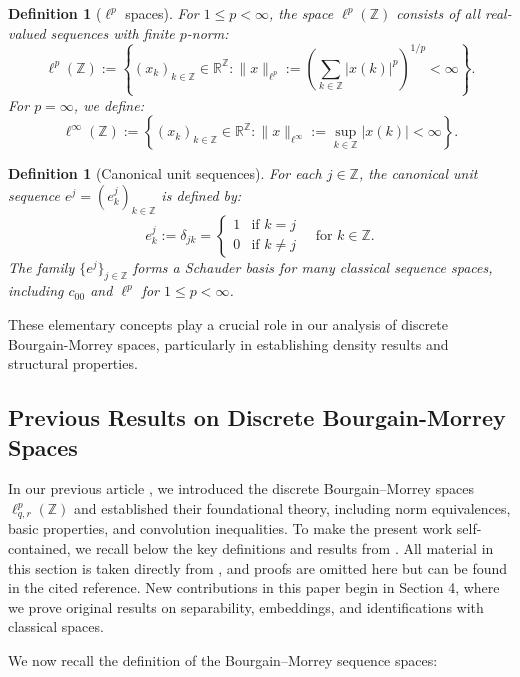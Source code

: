 \documentclass[preprint,12pt]{elsarticle}
\newtheorem{definition}[theorem]{Definition}
\begin{document}
\begin{definition}[$\ell^p$ spaces]
For $1 \leq p < \infty$, the space $\ell^p(\mathbb{Z})$ consists of all real-valued sequences with finite $p$-norm:
\[
\ell^p(\mathbb{Z}) := \left\{ (x_k)_{k \in \mathbb{Z}} \in \mathbb{R}^{\mathbb{Z}} : \|x\|_{\ell^{p}} := \left( \sum_{k \in \mathbb{Z}} |x(k)|^p \right)^{1/p} < \infty \right\}.
\]
For $p = \infty$, we define:
\[
\ell^\infty(\mathbb{Z}) := \left\{ (x_k)_{k \in \mathbb{Z}} \in \mathbb{R}^{\mathbb{Z}} : \|x\|_{\ell^{\infty}} := \sup_{k \in \mathbb{Z}} |x(k)| < \infty \right\}.
\]
\end{definition}

\begin{definition}[Canonical unit sequences]\label{canonical sequences}
For each $j \in \mathbb{Z}$, the \emph{canonical unit sequence} $e^j = (e^j_k)_{k \in \mathbb{Z}}$ is defined by:
\[
e^j_k := \delta_{jk} = 
\begin{cases}
1 & \text{if } k = j \\
0 & \text{if } k \neq j
\end{cases}
\quad \text{for } k \in \mathbb{Z}.
\]
The family $\{e^j\}_{j \in \mathbb{Z}}$ forms a Schauder basis for many classical sequence spaces, including $c_{00}$ and $\ell^p$ for $1 \leq p < \infty$.
\end{definition}

These elementary concepts play a crucial role in our analysis of discrete Bourgain-Morrey spaces, particularly in establishing density results and structural properties.
\label{subsec1}
\subsection{Previous Results on Discrete Bourgain-Morrey Spaces}

In our previous article \cite{GuzmanSanMartinVillegas}, we introduced the discrete Bourgain–Morrey spaces $\ell^{p}_{q,r}(\mathbb{Z})$
and established their foundational theory, including norm equivalences, basic properties, and convolution inequalities. To make the present work self-contained, we recall below the key definitions and results from \cite{GuzmanSanMartinVillegas}. All material in this section is taken directly from \cite{GuzmanSanMartinVillegas}, and proofs are omitted here but can be found in the cited reference. New contributions in this paper begin in Section 4, where we prove original results on separability, embeddings, and identifications with classical spaces.

We now recall the definition of the Bourgain–Morrey sequence spaces:
\end{document}
